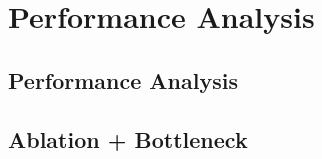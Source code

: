 \section{Performance Analysis}

\subsection{Performance Analysis}


\subsection{Ablation + Bottleneck}
\label{sec:bottleneck}

